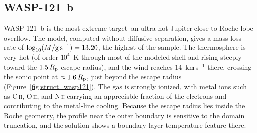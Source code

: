 \documentclass[twocolumn]{aastex702}
\newcommand{\Rp}{R_{\rm p}}
\newcommand{\Mdot}{\dot{M}}
\begin{document}
\subsection{WASP-121~b}
\label{sec:wasp121}

WASP-121~b is the most extreme target, an ultra-hot Jupiter close to Roche-lobe overflow.
The model, computed without diffusive separation, gives a mass-loss rate of
$\log_{10}(\Mdot/{\rm g\,s^{-1}})=13.20$, the highest of the sample. The thermosphere is
very hot (of order $10^{4}$~K through most of the modeled shell and rising steeply toward
the $1.5\,\Rp$ escape radius), and the wind reaches $14$~km\,s$^{-1}$ there, crossing the
sonic point at $\approx1.6\,\Rp$, just beyond the escape radius
(Figure~\ref{fig:struct_wasp121}). The gas is strongly ionized, with metal ions
such as \mbox{C\,\textsc{ii}}, \mbox{O\,\textsc{ii}}, and \mbox{N\,\textsc{ii}} carrying an
appreciable fraction of the electrons and contributing to the metal-line cooling. Because
the escape radius lies inside the Roche geometry, the profile near the outer boundary is
sensitive to the domain truncation, and the solution shows a boundary-layer
temperature feature there.
\end{document}
